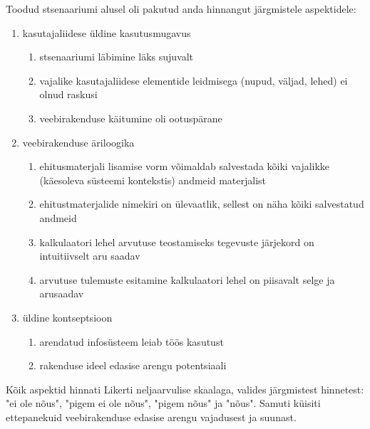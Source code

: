 Toodud stsenaariumi alusel oli pakutud anda hinnangut järgmistele aspektidele:
\begin{enumerate}
    \item kasutajaliidese üldine kasutusmugavus
    \begin{enumerate}
        \item stsenaariumi läbimine läks sujuvalt
        \item vajalike kasutajaliidese elementide leidmisega (nupud, väljad, lehed) ei olnud raskusi
        \item veebirakenduse käitumine oli ootuspärane
    \end{enumerate}
    \item veebirakenduse äriloogika 
    \begin{enumerate}
        \item ehitusmaterjali lisamise vorm võimaldab salvestada kõiki vajalikke (käesoleva süsteemi kontekstis) andmeid materjalist
        \item ehitustmaterjalide nimekiri on ülevaatlik, sellest on näha kõiki salvestatud andmeid
        \item kalkulaatori lehel arvutuse teostamiseks tegevuste järjekord on intuitiivselt aru saadav
        \item arvutuse tulemuste esitamine kalkulaatori lehel on piisavalt selge ja arusaadav
    \end{enumerate}
    \item üldine kontseptsioon
    \begin{enumerate}
        \item arendatud infosüsteem leiab töös kasutust
        \item rakenduse ideel edasise arengu potentsiaali
    \end{enumerate}
\end{enumerate}

Kõik aspektid hinnati Likerti neljaarvulise skaalaga, valides järgmistest hinnetest: "ei ole nõus", "pigem ei ole nõus", "pigem nõus" ja "nõus". 
Samuti küisiti ettepanekuid veebirakenduse edasise arengu vajadusest ja suunast. 


